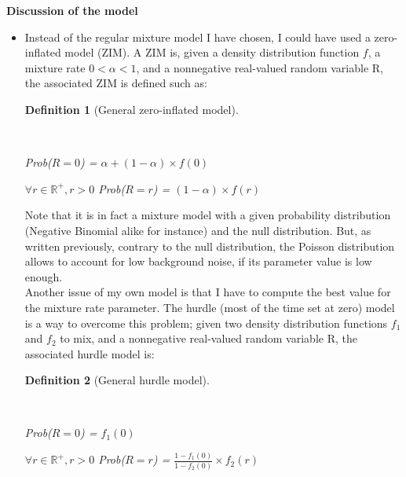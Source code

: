 \documentclass{report}
\newtheorem{definition}{Definition}[section]
\begin{document}
\bigskip
\noindent \textbf{Discussion of the model}
\bigskip

\begin{itemize}

\item Instead of the regular mixture model I have chosen, I could have used a zero-inflated model (ZIM)\cite{rodriguez2013models}. A ZIM is, given a density distribution function $f$, a mixture rate $0 < \alpha < 1$, and a nonnegative real-valued random variable R, the associated ZIM is defined such as:

\begin{definition}[General zero-inflated model]\label{zeroinflated}{ ~\\
\begin{center} \textit{Prob}($R = 0$) = $\alpha + (1-\alpha) \times f(0)$ \end{center}
\begin{center} $\forall r \in \mathbb{R}^+, r > 0$ \textit{Prob}($R = r$) = $(1-\alpha) \times f(r)$ \end{center}
}\end{definition}

Note that it is in fact a mixture model with a given probability distribution (Negative Binomial alike for instance) and the null distribution. But, as written previously, contrary to the null distribution, the Poisson distribution allows to account for low background noise\cite{kharchenko2014bayesian}, if its parameter value is low enough.\\

Another issue of my own model is that I have to compute the best value for the mixture rate parameter. The hurdle (most of the time set at zero) model is a way to overcome this problem; given two density distribution functions $f_1$ and $f_2$ to mix, and a nonnegative real-valued random variable R, the associated hurdle model is\cite{arnold2009advances}:

\begin{definition}[General hurdle model]\label{hurdlemodel}{ ~\\

\begin{center} \textit{Prob}($R = 0$) = $f_1(0)$ \end{center}
\begin{center} $\forall r \in \mathbb{R}^+, r > 0$ \textit{Prob}($R = r$) = $\frac{1-f_1(0)}{1-f_2(0)} \times f_2(r)$ \end{center}
}\end{definition}


\end{itemize}
\end{document}
